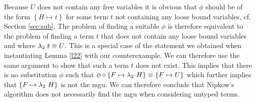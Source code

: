 Because $U$ does not contain any free variables it is obvious that $\phi$ should be of the form $\left\{ H \mapsto t \right\}$ for some term $t$ not containing any loose bound variables, cf. Section \ref{sec:sub}. The problem of finding a suitable $\phi$ is therefore equivalent to the problem of finding a term $t$ that does not contain any loose bound variables and where $\lambda_{2} \ t \equiv U$. This is a special case of the statement we obtained when instantiating Lemma \ref{l22} with our counterexample. We can therefore use the same argument to show that such a term $t$ does not exist. This implies that there is no substitution $\phi$ such that $\phi \circ \left\{ F \mapsto \lambda_{2} \ H \right\} \equiv \left\{ F \mapsto U \right\}$ which further implies that $\left\{ F \mapsto \lambda_{2} \ H \right\}$ is not the mgu. We can therefore conclude that Nipkow's algorithm does not necessarily find the mgu when considering untyped terms.